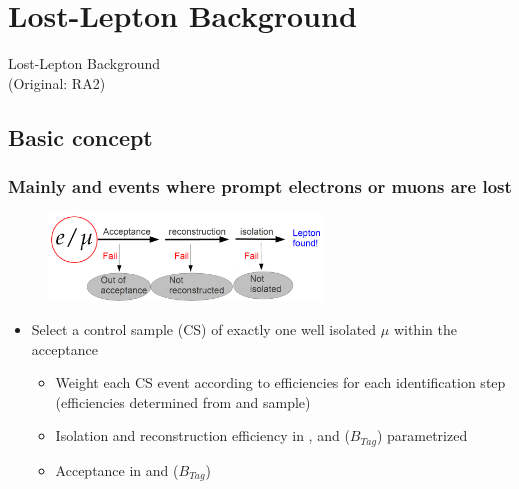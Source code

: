 \documentclass{beamer}
\begin{document}
\section{Lost-Lepton Background }
\begin{frame}
  \begin{center}
    \huge Lost-Lepton Background\\ \small(Original: RA2)
    
  \end{center}
\end{frame}

\subsection{Basic concept}
\begin{frame}
  \frametitle{Mainly \ttbar and \wpj events where prompt electrons or muons are lost}
   \begin{figure}
 \centering
  \includegraphics[width = 0.65\textwidth]{figures/lost-lepton/lepton_veto_sketch.png}
 \end{figure}
      \begin{itemize}
      \item Select a control sample (CS) of exactly one well isolated $\mu$ within the acceptance
        \begin{itemize}
        \item Weight each CS event according to efficiencies for each identification step (efficiencies determined from \ttbar and \wpj sample)
        \item Isolation and reconstruction efficiency in \HT, \MHT and \NJets ($B_{Tag}$) parametrized
        \item Acceptance in \MHT and \NJets ($B_{Tag}$)
        \end{itemize}
      \end{itemize}
\end{frame}
\end{document}
